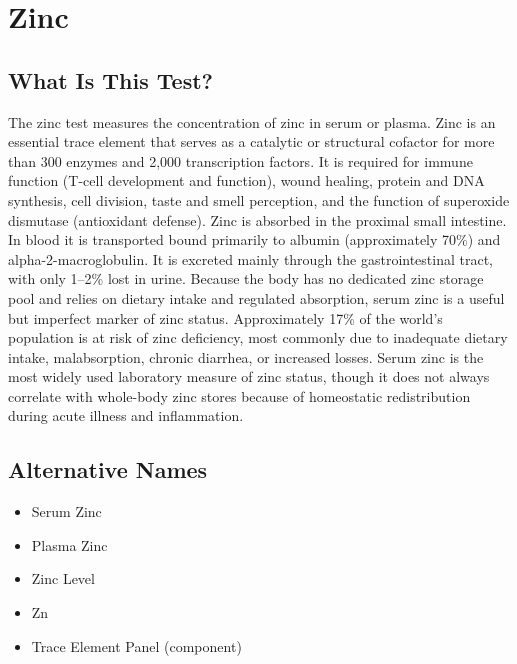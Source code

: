 \chapter{Zinc}

\section*{What Is This Test?}
The zinc test measures the concentration of zinc in serum or plasma. Zinc is an essential trace element that serves as a catalytic or structural cofactor for more than 300 enzymes and 2,000 transcription factors. It is required for immune function (T-cell development and function), wound healing, protein and DNA synthesis, cell division, taste and smell perception, and the function of superoxide dismutase (antioxidant defense). Zinc is absorbed in the proximal small intestine. In blood it is transported bound primarily to albumin (approximately 70\%) and alpha-2-macroglobulin. It is excreted mainly through the gastrointestinal tract, with only 1--2\% lost in urine. Because the body has no dedicated zinc storage pool and relies on dietary intake and regulated absorption, serum zinc is a useful but imperfect marker of zinc status. Approximately 17\% of the world's population is at risk of zinc deficiency, most commonly due to inadequate dietary intake, malabsorption, chronic diarrhea, or increased losses. Serum zinc is the most widely used laboratory measure of zinc status, though it does not always correlate with whole-body zinc stores because of homeostatic redistribution during acute illness and inflammation.

\section*{Alternative Names}
\begin{itemize}
  \item Serum Zinc
  \item Plasma Zinc
  \item Zinc Level
  \item Zn
  \item Trace Element Panel (component)
\end{itemize}
